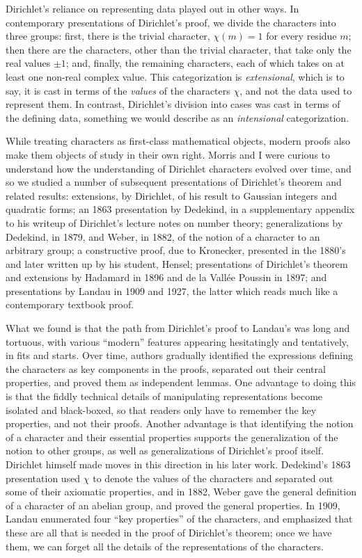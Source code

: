 \documentclass[12pt]{article}
\begin{document}
Dirichlet's reliance on representing data played out in other ways. In contemporary presentations of Dirichlet's proof, we divide the characters into three groups: first, there is the trivial character, $\chi(m) = 1$ for every residue $m$; then there are the characters, other than the trivial character, that take only the real values $\pm 1$; and, finally, the remaining characters, each of which takes on at least one non-real complex value. This categorization is \emph{extensional}, which is to say, it is cast in terms of the \emph{values} of the characters $\chi$, and not the data used to represent them. In contrast, Dirichlet's division into cases was cast in terms of the defining data, something we would describe as an \emph{intensional} categorization.

While treating characters as first-class mathematical objects, modern proofs also make them objects of study in their own right. Morris and I were curious to understand how the understanding of Dirichlet characters evolved over time, and so we studied a number of subsequent presentations of Dirichlet's theorem and related results: extensions, by Dirichlet, of his result to Gaussian integers and quadratic forms; an 1863 presentation by Dedekind, in a supplementary appendix to his writeup of Dirichlet's lecture notes on number theory; generalizations by Dedekind, in 1879, and Weber, in 1882, of the notion of a character to an arbitrary group;  a constructive proof, due to Kronecker, presented in the 1880's and later written up by his student, Hensel; presentations of Dirichlet's theorem and extensions by Hadamard in 1896 and de la Vall\'ee Poussin in 1897; and presentations by Landau in 1909 and 1927, the latter which reads much like a contemporary textbook proof.

What we found is that the path from Dirichlet's proof to Landau's was long and tortuous, with various ``modern'' features appearing hesitatingly and tentatively, in fits and starts. Over time, authors gradually identified the expressions defining the characters as key components in the proofs, separated out their central properties, and proved them as independent lemmas. One advantage to doing this is that the fiddly technical details of manipulating representations become isolated and black-boxed, so that readers only have to remember the key properties, and not their proofs. Another advantage is that identifying the notion of a character and their essential properties supports the generalization of the notion to other groups, as well as generalizations of Dirichlet's proof itself. Dirichlet himself made moves in this direction in his later work. Dedekind's 1863 presentation used $\chi$ to denote the values of the characters and separated out some of their axiomatic properties, and in 1882, Weber gave the general definition of a character of an abelian group, and proved the general properties. In 1909, Landau enumerated four ``key properties'' of the characters, and emphasized that these are all that is needed in the proof of Dirichlet's theorem; once we have them, we can forget all the details of the representations of the characters.
\end{document}
